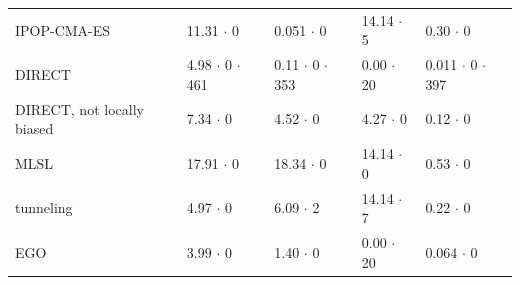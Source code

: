\begin{table}[t]
\begin{tabular}{lllll}
    IPOP-CMA-ES & 11.31 $\cdot$ 0 & 0.051 $\cdot$ 0 & 14.14 $\cdot$ 5 & 0.30 $\cdot$ 0 \\
    DIRECT & 4.98 $\cdot$ 0 $\cdot$ 461 & 0.11 $\cdot$ 0 $\cdot$ 353 & 0.00 $\cdot$ 20 & 0.011 $\cdot$ 0 $\cdot$ 397 \\
    DIRECT, not locally biased & 7.34 $\cdot$ 0 & 4.52 $\cdot$ 0 & 4.27 $\cdot$ 0 & 0.12 $\cdot$ 0 \\
    MLSL & 17.91 $\cdot$ 0 & 18.34 $\cdot$ 0 & 14.14 $\cdot$ 0 & 0.53 $\cdot$ 0 \\
    tunneling & 4.97 $\cdot$ 0 & 6.09 $\cdot$ 2 & 14.14 $\cdot$ 7 & 0.22 $\cdot$ 0 \\
    EGO & 3.99 $\cdot$ 0 & 1.40 $\cdot$ 0 & 0.00 $\cdot$ 20 & 0.064 $\cdot$ 0 \\
    \bottomrule
  \end{tabular}
\end{table}
